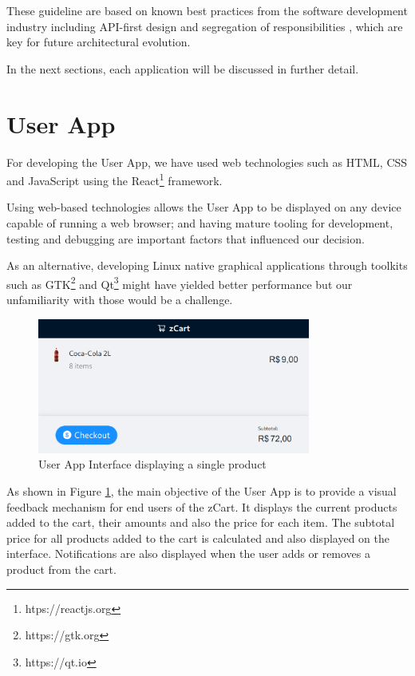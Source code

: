 \documentclass[openright]{normas-utf-tex} %
\begin{document}
These guideline are based on known best practices from the software 
development industry including API-first design and segregation of
responsibilities \cite{Sam2021,Kong2022}, which are key for future architectural
evolution.

In the next sections, each application will be discussed in further detail.

\section{User App}

For developing the User App, we have used web technologies such 
as HTML, CSS \cite{Duckett2011} and JavaScript \cite{Flanagan2020} using the 
React\footnote{htps://reactjs.org} framework. 

Using web-based technologies allows the User App to be displayed on any 
device capable of running a web browser; and having mature tooling for 
development, testing and debugging are important factors that influenced 
our decision.

As an alternative, developing Linux native graphical applications through
toolkits such as GTK\footnote{https://gtk.org} and Qt\footnote{https://qt.io}
might have yielded better performance but our unfamiliarity with those would be
a challenge.

\begin{figure}[H]
	\centering
	\includegraphics[width=0.8\textwidth]{./images/ui.png}
	\caption[User App Interface display a single product]{User App Interface displaying a single product}
	\label{fig:userapp}
\end{figure}

As shown in Figure \ref{fig:userapp}, the main objective of the User App is to
provide a visual feedback mechanism for end users of the zCart. It displays the
current products added to the cart, their amounts and also the price for each
item. The subtotal price for all products added to the cart is calculated and
also displayed on the interface. Notifications are also displayed when the user
adds or removes a product from the cart. 
\end{document}
